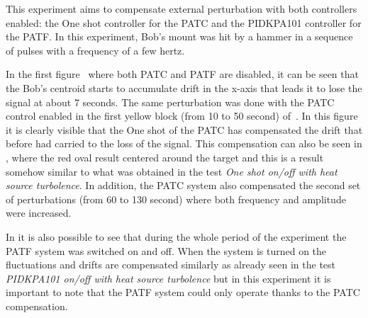 This experiment aims to compensate external perturbation with both controllers enabled: the One shot controller for the PATC and the PIDKPA101 controller for the PATF.
In this experiment, Bob’s mount was hit by a hammer in a sequence of pulses with a frequency of a few hertz.

In the first figure~ where both PATC and PATF are disabled, it can be seen that the Bob's centroid starts to accumulate drift in the x-axis that leads it to lose the signal at about 7 seconds.
The same perturbation was done with the PATC control enabled in the first yellow block (from 10 to 50 second) of~.
In this figure it is clearly visible that the One shot of the PATC has compensated the drift that before had carried to the loss of the signal. This compensation can also be seen in , where the red oval result centered around the target and this is a result somehow similar to what was obtained in the test \textit{One shot on/off with heat source turbolence}.
In addition, the PATC system also compensated the second set of perturbations (from 60 to 130 second) where both frequency and amplitude were increased.

In  it is also possible to see that during the whole period of the experiment the PATF system was switched on and off.
When the system is turned on the fluctuations and drifts are compensated similarly as already seen in the test \textit{PIDKPA101 on/off with heat source turbolence} but in this experiment it is important to note that the PATF system could only operate thanks to the PATC compensation.

